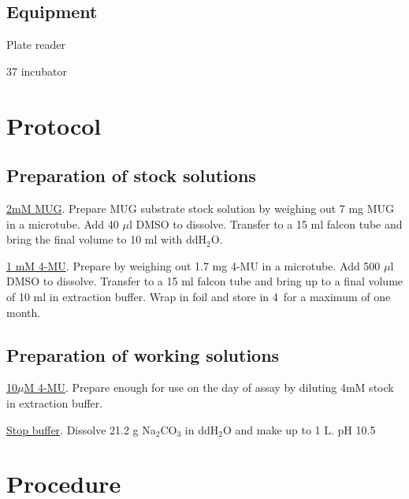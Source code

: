 	\subsection{Equipment}
	\begin{packed_enum}
	\item Plate reader
	\item 37 {\textcelsius} incubator
	\item 
	\end{packed_enum}
 
\section{Protocol}
	\subsection{Preparation of stock solutions}
	\begin{packed_enum}
	\item {\underline{2mM MUG}}. Prepare MUG substrate stock solution by weighing out 7 mg MUG in a microtube. Add 40 $\mu$l DMSO to dissolve. Transfer to a 15 ml falcon tube and bring the final volume to 10 ml with ddH$_{2}$O.
	\item \underline{1 mM 4-MU}. Prepare by weighing out 1.7 mg 4-MU in a microtube. Add 500 $\mu$l DMSO to dissolve. Transfer to a 15 ml falcon tube and bring up to a final volume of 10 ml in extraction buffer. Wrap in foil and store in 4\textcelsius\ for a maximum of one month.
	\end{packed_enum}
	\subsection{Preparation of working solutions}
	\begin{packed_enum}
		\item {\underline{10$\mu$M 4-MU}}. Prepare enough for use on the day of assay by diluting 4mM stock in extraction buffer.
		\item {\underline{Stop buffer}}. Dissolve 21.2 g Na$_{2}$CO$_{3}$ in ddH$_{2}$O and make up to 1 L. pH 10.5
	\end{packed_enum}
\section{Procedure}
	


